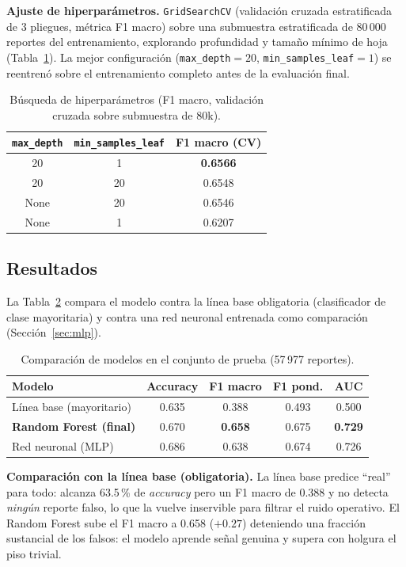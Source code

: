 \documentclass[11pt,letterpaper]{article}
\begin{document}
\textbf{Ajuste de hiperparámetros.} \texttt{GridSearchCV} (validación cruzada
estratificada de 3 pliegues, métrica F1 macro) sobre una submuestra
estratificada de 80\,000 reportes del entrenamiento, explorando profundidad y
tamaño mínimo de hoja (Tabla~\ref{tab:tuning}). La mejor configuración
(\texttt{max\_depth}$=20$, \texttt{min\_samples\_leaf}$=1$) se reentrenó sobre
el entrenamiento completo antes de la evaluación final.

\begin{table}[H]
\centering
\caption{Búsqueda de hiperparámetros (F1 macro, validación cruzada sobre submuestra de 80k).}
\label{tab:tuning}
\small
\begin{tabular}{@{}ccc@{}}
\toprule
\texttt{max\_depth} & \texttt{min\_samples\_leaf} & \textbf{F1 macro (CV)}\\
\midrule
20   & 1  & \textbf{0.6566}\\
20   & 20 & 0.6548\\
None & 20 & 0.6546\\
None & 1  & 0.6207\\
\bottomrule
\end{tabular}
\end{table}

\subsection{Resultados}

La Tabla~\ref{tab:modelos} compara el modelo contra la línea base obligatoria
(clasificador de clase mayoritaria) y contra una red neuronal entrenada como
comparación (Sección~\ref{sec:mlp}).

\begin{table}[H]
\centering
\caption{Comparación de modelos en el conjunto de prueba (57\,977 reportes).}
\label{tab:modelos}
\small
\begin{tabular}{@{}lcccc@{}}
\toprule
\textbf{Modelo} & \textbf{Accuracy} & \textbf{F1 macro} & \textbf{F1 pond.} & \textbf{AUC}\\
\midrule
Línea base (mayoritario) & 0.635 & 0.388 & 0.493 & 0.500\\
\textbf{Random Forest (final)} & 0.670 & \textbf{0.658} & 0.675 & \textbf{0.729}\\
Red neuronal (MLP) & 0.686 & 0.638 & 0.674 & 0.726\\
\bottomrule
\end{tabular}
\end{table}

\textbf{Comparación con la línea base (obligatoria).} La línea base predice
``real'' para todo: alcanza 63.5\,\% de \emph{accuracy} pero un F1 macro de
0.388 y no detecta \emph{ningún} reporte falso, lo que la vuelve inservible
para filtrar el ruido operativo. El Random Forest sube el F1 macro a 0.658
($+0.27$) deteniendo una fracción sustancial de los falsos: el modelo aprende
señal genuina y supera con holgura el piso trivial.
\end{document}
